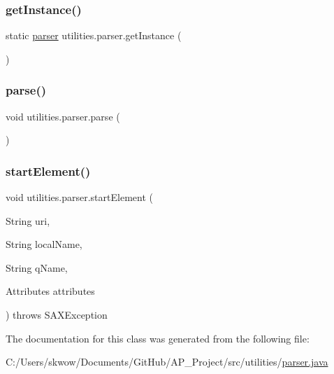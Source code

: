 \subsubsection{\texorpdfstring{get\+Instance()}{getInstance()}}
{\footnotesize\ttfamily static \hyperlink{classutilities_1_1parser}{parser} utilities.\+parser.\+get\+Instance (\begin{DoxyParamCaption}{ }\end{DoxyParamCaption})\hspace{0.3cm}{\ttfamily [static]}}

\hypertarget{classutilities_1_1parser_ae11f73c41940e9ee2d05b95ab2fb9435}{}\label{classutilities_1_1parser_ae11f73c41940e9ee2d05b95ab2fb9435} 
\subsubsection{\texorpdfstring{parse()}{parse()}}
{\footnotesize\ttfamily void utilities.\+parser.\+parse (\begin{DoxyParamCaption}{ }\end{DoxyParamCaption})}

\hypertarget{classutilities_1_1parser_a89378ec321afe4275ae9a6f5833e5fb9}{}\label{classutilities_1_1parser_a89378ec321afe4275ae9a6f5833e5fb9} 
\subsubsection{\texorpdfstring{start\+Element()}{startElement()}}
{\footnotesize\ttfamily void utilities.\+parser.\+start\+Element (\begin{DoxyParamCaption}\item[{String}]{uri,  }\item[{String}]{local\+Name,  }\item[{String}]{q\+Name,  }\item[{Attributes}]{attributes }\end{DoxyParamCaption}) throws S\+A\+X\+Exception}



The documentation for this class was generated from the following file\+:\begin{DoxyCompactItemize}
\item 
C\+:/\+Users/skwow/\+Documents/\+Git\+Hub/\+A\+P\+\_\+\+Project/src/utilities/\hyperlink{parser_8java}{parser.\+java}\end{DoxyCompactItemize}
